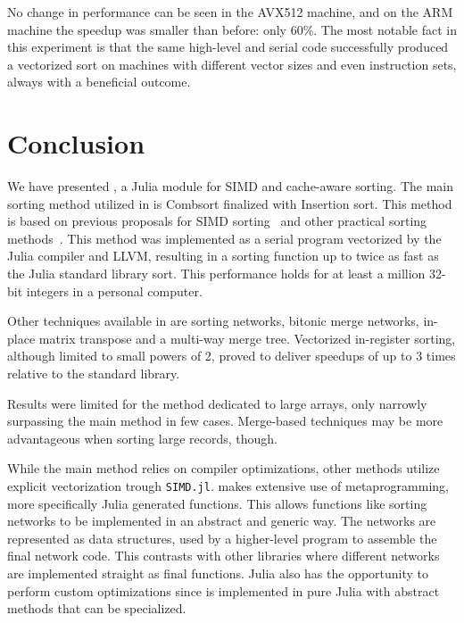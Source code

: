 \documentclass{juliacon}
\begin{document}
No change in performance can be seen in the AVX512 machine, and on the ARM machine the speedup was smaller than before: only 60\%. The most notable fact in this experiment is that the same high-level and serial code successfully produced a vectorized sort on machines with different vector sizes and even instruction sets, always with a beneficial outcome.

\section{Conclusion}
\label{sec:conclusion}
%
We have presented \chipsort, a Julia module for SIMD and cache-aware sorting. The main sorting method utilized in \chipsort is Combsort finalized with Insertion sort. This method is based on previous proposals for SIMD sorting~\cite{DBLP:conf/IEEEpact/InoueMKN07,DBLP:journals/pvldb/InoueT15} and other practical sorting methods~\cite{INCERPI198737,musser1997introspective}. This method was implemented as a serial program vectorized by the Julia compiler and LLVM, resulting in a sorting function up to twice as fast as the Julia standard library sort. This performance holds for at least a million 32-bit integers in a personal computer.

Other techniques available in \chipsort are sorting networks, bitonic merge networks, in-place matrix transpose and a multi-way merge tree. Vectorized in-register sorting, although limited to small powers of 2, proved to deliver speedups of up to 3 times relative to the standard library.

Results were limited for the method dedicated to large arrays, only narrowly surpassing the main \chipsort method in few cases. Merge-based techniques may be more advantageous when sorting large records, though.

While the main \chipsort method relies on compiler optimizations, other methods utilize explicit vectorization trough {\tt SIMD.jl}. \chipsort makes extensive use of metaprogramming, more specifically Julia generated functions. This allows functions like sorting networks to be implemented in an abstract and generic way. The networks are represented as data structures, used by a higher-level program to assemble the final network code. This contrasts with other libraries where different networks are implemented straight as final functions. Julia also has the opportunity to perform custom optimizations since \chipsort is implemented in pure Julia with abstract methods that can be specialized.
\end{document}
